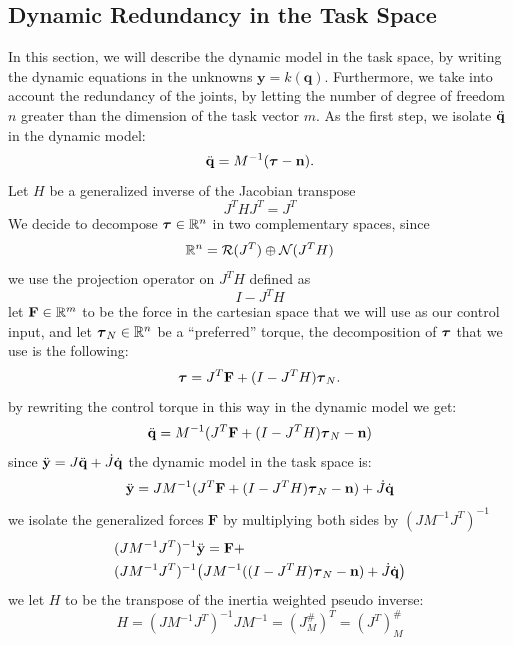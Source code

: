\documentclass[10pt, a4paper]{report}
\newcommand{\q}{{\mathbf q}}
\begin{document}
\subsection{Dynamic Redundancy in the Task Space}
In this section, we will describe the dynamic model in the task space, by writing the dynamic equations in the unknowns $\mathbf y=k(\q)$. Furthermore, we take into account the redundancy of the joints, by letting the number of degree of freedom $n$ greater than the dimension of the task vector $m$. As the first step, we isolate ${\ddot{\mathbf q}}$ in the dynamic model:\begin{equation}
    {\ddot{\mathbf q}}=M^{-1}({\boldsymbol{\tau}}-\mathbf n).
\end{equation}
Let $H$ be a generalized inverse of the Jacobian transpose $$ J^THJ^T =J^T$$
We decide to decompose ${\boldsymbol{\tau}}\in {\mathbb R}^n$ in two complementary spaces, since\begin{eqnarray}
    {\mathbb R}^n=\mathcal R(J^T)\oplus\mathcal N(J^TH)
\end{eqnarray}
we use the projection operator on $J^TH$ defined as\begin{equation}
    I-J^TH
\end{equation}
let $\mathbf F\in {\mathbb R}^m$ to be the force in the cartesian space that we will use as our control input, and let ${\boldsymbol{\tau}}_N\in {\mathbb R}^n$ be a ``preferred'' torque, the decomposition of ${\boldsymbol{\tau}}$ that we use is the following:\begin{equation}
    {\boldsymbol{\tau}}=J^T\mathbf F+(I-J^TH){\boldsymbol{\tau}}_N.
\end{equation}
by rewriting the control torque in this way in the dynamic model we get:\begin{equation}
    {\ddot{\mathbf q}}=M^{-1}(J^T\mathbf F+(I-J^TH){\boldsymbol{\tau}}_N-\mathbf n)
\end{equation}
since ${\ddot{\mathbf y}}=J{\ddot{\mathbf q}}+\dot J{\dot{\mathbf q}}$ the dynamic model in the task space is:\begin{equation}
    {\ddot{\mathbf y}}=JM^{-1}(J^T\mathbf F+(I-J^TH){\boldsymbol{\tau}}_N-\mathbf n)+\dot J{\dot{\mathbf q}}
\end{equation}
we isolate the generalized forces $\mathbf F$ by multiplying both sides by $(JM^{-1}J^T)^{-1}$\begin{align}
    &(JM^{-1}J^T)^{-1}{\ddot{\mathbf y}}=\mathbf F+\\ 
    &(JM^{-1}J^T)^{-1}\big(JM^{-1}((I-J^TH){\boldsymbol{\tau}}_N-\mathbf n)+\dot J{\dot{\mathbf q}}\big)
\end{align}
we let $H$ to be the transpose of the inertia weighted pseudo inverse:\begin{equation}
    H=(JM^{-1}J^T)^{-1}JM^{-1}=(J^\#_M)^T=(J^T)_M^\#
\end{equation}
\end{document}

